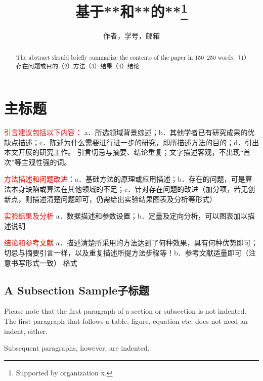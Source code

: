 \documentclass[runningheads]{llncs}
\begin{document}
%
\title{基于**和**的**\thanks{Supported by organization x.}}
%
%
\author{作者，学号，邮箱}
%
%
%
\maketitle              %
%
\begin{abstract}
The abstract should briefly summarize the contents of the paper in
150--250 words.（1）存在问题或目的（2）方法（3）结果（4）结论

\end{abstract}
%
%
%
\section{主标题}
\textcolor{red}{引言建议包括以下内容：}
a．所选领域背景综述；b．其他学者已有研究成果的优缺点描述；c．陈述为什么需要进行进一步的研究，即所描述方法的目的；d．引出本文开展的研究工作。
引言切忌与摘要、结论重复；文字描述客观，不出现“首次”等主观性强的词。

\textcolor{red}{方法描述和问题改进}：a．基础方法的原理或应用描述；b．存在的问题，可是算法本身缺陷或算法在其他领域的不足；c．针对存在问题的改进（加分项，若无创新点，则描述清楚问题即可，仍需给出实验结果图表及分析等形式）

\textcolor{red}{实验结果及分析}
a．数据描述和参数设置；b．定量及定向分析，可以图表加以描述说明

\textcolor{red}{结论和参考文献}
a．描述清楚所采用的方法达到了何种效果，具有何种优势即可；切忌与摘要引言一样，以及重复描述所提方法步骤等！b．参考文献适量即可（注意书写形式一致）
格式


\subsection{A Subsection Sample子标题}
Please note that the first paragraph of a section or subsection is
not indented. The first paragraph that follows a table, figure,
equation etc. does not need an indent, either.

Subsequent paragraphs, however, are indented.
\end{document}
